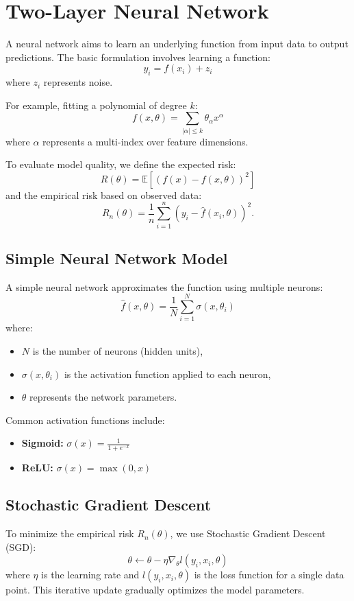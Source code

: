 \documentclass{article}
\begin{document}
\section{Two-Layer Neural Network}
A neural network aims to learn an underlying function from input data to output predictions. 
The basic formulation involves learning a function:
\[
y_i = f(x_i) + z_i
\]
where $z_i$ represents noise.

For example, fitting a polynomial of degree $k$:
\[
f(x, \theta) = \sum_{|\alpha| \leq k} \theta_{\alpha} x^{\alpha}
\]
where $\alpha$ represents a multi-index over feature dimensions.

To evaluate model quality, we define the expected risk:
\[
R(\theta) = \mathbb{E}\left[(f(x) - f(x,\theta))^2\right]
\]
and the empirical risk based on observed data:
\[
R_n(\theta) = \frac{1}{n}\sum_{i=1}^{n} (y_i - \hat{f}(x_i,\theta))^2.
\]

\subsection{Simple Neural Network Model}
A simple neural network approximates the function using multiple neurons:
\[
\hat{f}(x,\theta) = \frac{1}{N}\sum_{i=1}^{N} \sigma(x,\theta_i)
\]
where:
\begin{itemize}
  \item $N$ is the number of neurons (hidden units),
  \item $\sigma(x,\theta_i)$ is the activation function applied to each neuron,
  \item $\theta$ represents the network parameters.
\end{itemize}
Common activation functions include:
\begin{itemize}
  \item \textbf{Sigmoid:} $\sigma(x) = \frac{1}{1 + e^{-x}}$
  \item \textbf{ReLU:} $\sigma(x) = \max(0, x)$
\end{itemize}

\subsection{Stochastic Gradient Descent}
To minimize the empirical risk $R_n(\theta)$, we use Stochastic Gradient Descent (SGD):
\[
\theta \leftarrow \theta - \eta \nabla_{\theta} l(y_i, x_i, \theta)
\]
where $\eta$ is the learning rate and $l(y_i, x_i, \theta)$ is the loss function for a single data point. This iterative update gradually optimizes the model parameters.
\end{document}
